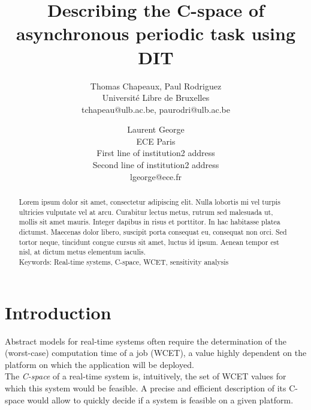 \documentclass[times, 10pt,twocolumn, a4paper]{article}
\begin{document}
\title{Describing the C-space of asynchronous periodic task using DIT}

\author{Thomas Chapeaux, Paul Rodriguez\\
Universit\'e Libre de Bruxelles\\ tchapeau@ulb.ac.be, paurodri@ulb.ac.be \\
\and
Laurent George\\
ECE Paris\\
First line of institution2 address\\ Second line of institution2 address\\
lgeorge@ece.fr\\
}

\maketitle
\thispagestyle{empty}

\begin{abstract}
	Lorem ipsum dolor sit amet, consectetur adipiscing elit. Nulla lobortis mi vel
turpis ultricies vulputate vel at arcu. Curabitur lectus metus, rutrum sed malesuada ut, mollis sit amet mauris. Integer dapibus in risus et porttitor. In hac habitasse platea dictumst. Maecenas dolor libero, suscipit porta consequat eu, consequat non orci. Sed tortor neque, tincidunt congue cursus sit amet, luctus id ipsum. Aenean tempor est nisl, at dictum metus elementum iaculis.\\

Keywords: Real-time systems, C-space, WCET, sensitivity analysis
\end{abstract}



\section{Introduction}

	Abstract models for real-time systems often require the determination of the
	(worst-case) computation time of a job (WCET), a value highly dependent on the
	platform on which the application will be deployed.\\

	The \emph{C-space} of a real-time system is, intuitively,
	the set of WCET values for which this system would be feasible. A
	precise and efficient description of its C-space would allow to quickly decide
	if a system is feasible on a given platform.\\
\end{document}
